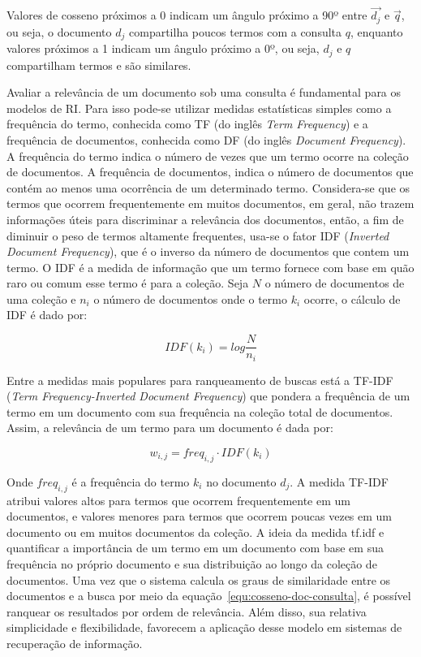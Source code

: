 Valores de cosseno próximos a 0 indicam um ângulo próximo a 90º entre $\vec{d_j}$ e $\vec{q}$, ou seja, o documento $d_j$ compartilha poucos termos com a consulta $q$, enquanto valores próximos a 1 indicam um ângulo próximo a 0º, ou seja, $d_j$ e $q$ compartilham termos e são similares.

Avaliar a relevância de um documento sob uma consulta é fundamental para os modelos de RI. Para isso pode-se utilizar medidas estatísticas simples como a frequência do termo, conhecida como TF (do inglês \textit{Term Frequency}) e a frequência de documentos, conhecida como DF (do inglês \textit{Document Frequency}). A frequência do termo indica o número de vezes que um termo ocorre na coleção de documentos. A frequência de documentos, indica o número de documentos que contém ao menos uma ocorrência de um determinado termo. Considera-se que os termos que ocorrem frequentemente em muitos documentos, em geral, não trazem informações úteis para discriminar a relevância dos documentos, então, a fim de diminuir o peso de termos altamente frequentes, usa-se o fator IDF (\textit{Inverted Document Frequency}), que é o inverso da número de documentos que contem um termo. O IDF é a medida de informação que um termo fornece com base em quão raro ou comum esse termo é para a coleção. Seja $N$ o número de documentos de uma coleção e $n_i$ o número de documentos onde o termo $k_i$ ocorre, o cálculo de IDF é dado por: 

	\begin{equation}
		IDF(k_i) = log\frac{N}{n_i}
		\label{equ:IDF}
	\end{equation}

Entre a medidas mais populares para ranqueamento de buscas está a TF-IDF (\textit{Term Frequency-Inverted Document Frequency}) que pondera a frequência de um termo em um documento com sua frequência na coleção total de documentos. Assim, a relevância de um termo para um documento é dada por:

\begin{equation}
	w_{i,j} = freq_{i,j} \cdot IDF(k_i)
\end{equation}


Onde $freq_{i,j}$ é a frequência do termo $k_i$ no documento $d_j$. A medida TF-IDF atribui valores altos para termos que ocorrem frequentemente em um documentos, e valores menores para termos que ocorrem poucas vezes em um documento ou em muitos documentos da coleção. A ideia da medida tf.idf e quantificar a importância de um termo em um documento com base em sua frequência no próprio documento e sua distribuição ao longo da coleção de documentos. Uma vez que o sistema calcula os graus de similaridade entre os documentos e a busca por meio da equação~\ref{equ:cosseno-doc-consulta}, é possível ranquear os resultados por ordem de relevância. Além disso, sua relativa simplicidade e flexibilidade, favorecem a aplicação desse modelo em sistemas de recuperação de informação.





